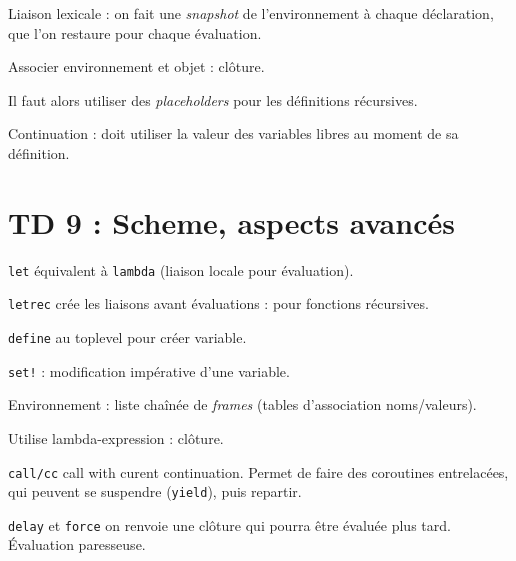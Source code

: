 \documentclass[french]{article}
\def\code#1{\texttt{#1}}
\begin{document}
Liaison lexicale : on fait une \textit{snapshot} de l'environnement à chaque déclaration, que l'on restaure pour chaque évaluation.

Associer environnement et objet : clôture.

Il faut alors utiliser des \textit{placeholders} pour les définitions récursives.

Continuation : doit utiliser la valeur des variables libres au moment de sa définition.

\section*{TD 9 : Scheme, aspects avancés}

\code{let} équivalent à \code{lambda} (liaison locale pour évaluation).

\code{letrec} crée les liaisons avant évaluations : pour fonctions récursives.

\code{define} au toplevel pour créer variable.

\code{set!} : modification impérative d'une variable.

Environnement : liste chaînée de \textit{frames} (tables d'association noms/valeurs).

Utilise lambda-expression : clôture.

\code{call/cc} call with curent continuation. Permet de faire des coroutines entrelacées, qui peuvent se suspendre (\code{yield}), puis repartir.

\code{delay} et \code{force} on renvoie une clôture qui pourra être évaluée plus tard. Évaluation paresseuse.
\end{document}

